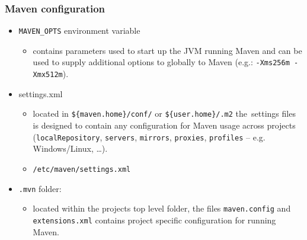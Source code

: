 \documentclass[10pt,xcolor=pdflatex]{beamer}
\begin{document}
\begin{frame}[fragile]\frametitle{Maven configuration}
\begin{itemize}
  \item \texttt{MAVEN\_OPTS} environment variable
    \begin{itemize}
      \item contains parameters used to start up the JVM running Maven and can be used to supply additional options to globally to Maven (e.g.: \texttt{-Xms256m -Xmx512m}).
    \end{itemize}
  \item settings.xml
    \begin{itemize}
      \item located in \verb+${maven.home}/conf/+ or \verb+${user.home}/.m2+ the~settings files is designed to contain any configuration for Maven usage across projects (\texttt{localRepository}, \texttt{servers}, \texttt{mirrors}, \texttt{proxies}, \texttt{profiles} -- e.g. Windows/Linux, \ldots ).
      \item \texttt{/etc/maven/settings.xml}
    \end{itemize}
  \item \texttt{.mvn} folder:
    \begin{itemize}
      \item located within the projects top level folder, the files \texttt{maven.config} and \texttt{extensions.xml} contains project specific configuration for running Maven.
    \end{itemize}
\end{itemize}
\end{frame}
\end{document}
